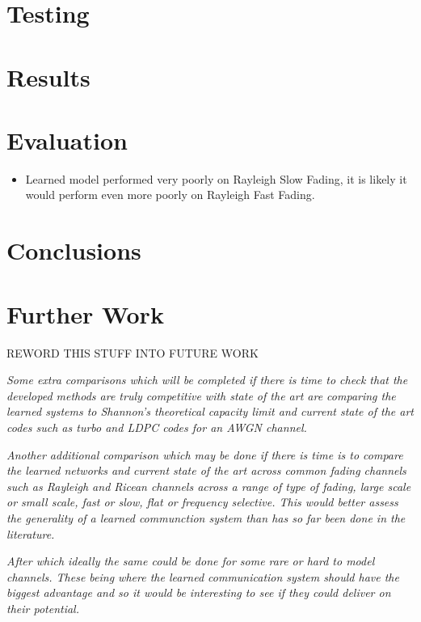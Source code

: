 \documentclass[12pt,onecolumn,letterpaper]{article}
\begin{document}
\FloatBarrier
\section{Testing}

\FloatBarrier
\section{Results}

\FloatBarrier
\section{Evaluation}

\begin{itemize}
   \item Learned model performed very poorly on Rayleigh Slow Fading, it is likely it would perform even more poorly on Rayleigh Fast Fading.
\end{itemize}

\FloatBarrier
\section{Conclusions}


\FloatBarrier
\section{Further Work}

REWORD THIS STUFF INTO FUTURE WORK

\textit{
Some extra comparisons which will be completed if there is time to check that the developed methods are truly competitive with state of the art are comparing the learned systems to Shannon's theoretical capacity limit and current state of the art codes such as turbo and LDPC codes for an AWGN channel.
}

\textit{
Another additional comparison which may be done if there is time is to compare the learned networks and current state of the art across common fading channels such as Rayleigh and Ricean channels across a range of type of fading, large scale or small scale, fast or slow, flat or frequency selective. This would better assess the generality of a learned communction system than has so far been done in the literature.
}

\textit{
After which ideally the same could be done for some rare or hard to model channels. These being where the learned communication system should have the biggest advantage and so it would be interesting to see if they could deliver on their potential.
}
\end{document}
